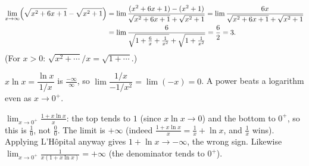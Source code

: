 \documentclass{fkt-notes}
\theoremstyle{definition}
\begin{document}
\begin{example}
  \begin{align*}
    \lim_{x\to\infty}\Bigl(\sqrt{x^2+6x+1}-\sqrt{x^2+1}\Bigr)
      &=\lim\frac{(x^2+6x+1)-(x^2+1)}{\sqrt{x^2+6x+1}+\sqrt{x^2+1}}
       =\lim\frac{6x}{\sqrt{x^2+6x+1}+\sqrt{x^2+1}}\\
      &=\lim\frac{6}{\sqrt{1+\frac6x+\frac1{x^2}}+\sqrt{1+\frac1{x^2}}}
       =\frac62=3.
  \end{align*}
  (For $x>0$: $\sqrt{x^2+\cdots}/x=\sqrt{1+\cdots}$.)
\end{example}
\begin{example}
  $x\ln x=\dfrac{\ln x}{1/x}$ is $\frac{-\infty}\infty$, so
  $\lim\dfrac{1/x}{-1/x^2}=\lim(-x)=0$. A power beats a logarithm even as
  $x\to0^+$.
\end{example}
\begin{example}
  $\displaystyle\lim_{x\to0^+}\frac{1+x\ln x}x$: the top tends to $1$
  (since $x\ln x\to0$) and the bottom to $0^+$, so this is $\frac10$, not
  $\frac00$. The limit is $+\infty$ (indeed $\frac{1+x\ln x}x=\frac1x+\ln x$,
  and $\frac1x$ wins). Applying L'H\^opital anyway gives $1+\ln x\to-\infty$,
  the wrong sign. Likewise $\displaystyle\lim_{x\to0^+}\frac1{x(1+x\ln x)}=+\infty$
  (the denominator tends to $0^+$).
\end{example}
\end{document}
